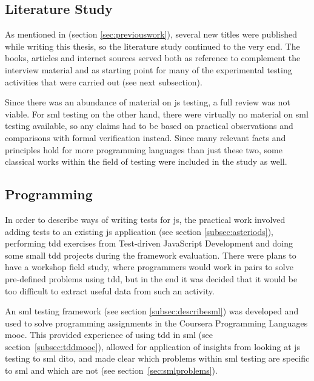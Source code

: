 \documentclass[11pt]{article}
\begin{document}
\subsection{Literature Study}

As mentioned in  (section \ref{sec:previouswork}), several new titles were published while writing this thesis, so the literature study continued to the very end. The books, articles and internet sources served both as reference to complement the interview material and as starting point for many of the experimental testing activities that were carried out (see next subsection).

Since there was an abundance of material on \gls{js} testing, a full review was not viable. For \gls{sml} testing on the other hand, there were virtually no material on \gls{sml} testing available, so any claims had to be based on practical observations and comparisons with formal verification instead. Since many relevant facts and principles hold for more programming languages than just these two, some classical works within the field of testing were included in the study as well.

\subsection{Programming}
\label{subsec:programming}

In order to describe ways of writing tests for \gls{js}, the practical work involved adding tests to an existing \gls{js} application (see section \ref{subsec:asteriods}), performing \gls{tdd} exercises from Test-driven JavaScript Development \cite[part~III]{Tddjs} and doing some small \gls{tdd} projects during the framework evaluation. There were plans to have a workshop field study, where programmers would work in pairs to solve pre-defined problems using \gls{tdd}, but in the end it was decided that it would be too difficult to extract useful data from such an activity.

An \gls{sml} testing framework (see section \ref{subsec:describesml}) was developed and used to solve programming assignments in the Coursera Programming Languages \gls{mooc}. This provided experience of using \gls{tdd} in \gls{sml} (see section~\ref{subsec:tddmooc}), allowed for application of insights from looking at \gls{js} testing to \gls{sml} dito, and made clear which problems within \gls{sml} testing are specific to \gls{sml} and which are not (see section~\ref{sec:smlproblems}).
\end{document}
